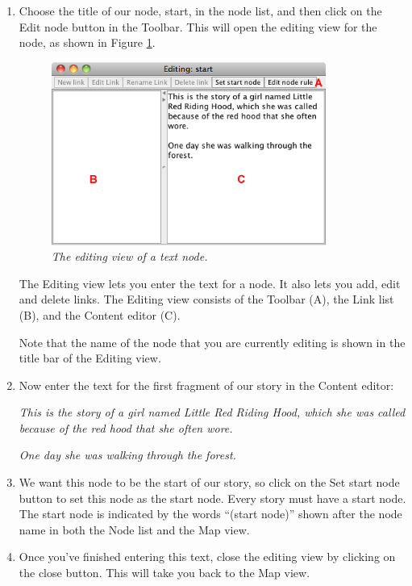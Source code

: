 \documentclass{article}
\begin{document}
\begin{enumerate}
  \item Choose the title of our node, start, in the node list, and then click
  on the Edit node button in the Toolbar. This will open the editing view for
  the node, as shown in Figure \ref{fig:tut1:edit_node}. 
  
\begin{figure}[ht]
  \centering
  \includegraphics[width=9cm]{images/hypedyn-tutorial-1-figure-5}
  \caption{\textit{The editing view of a text node.}}
  \label{fig:tut1:edit_node}
\end{figure} 

The Editing view lets you enter the text for a node. It also lets you add, edit
and delete links. The Editing view consists of the Toolbar (A), the Link list (B),
and the Content editor (C).

Note that the name of the node that you are currently editing is shown in the
title bar of the Editing view.

\item Now enter the text for the first fragment of our story in the Content
editor:

\textit{This is the story of a girl named Little Red Riding Hood, which she was
called because of the red hood that she often wore.}

\textit{One day she was walking through the forest.}

\item We want this node to be the start of our story, so click on the Set start
node button to set this node as the start node. Every story must have a start
node. The start node is indicated by the words ``(start node)'' shown after the
node name in both the Node list and the Map view.
\item Once you've finished entering this text, close the editing view by
clicking on the close button. This will take you back to the Map view.
\end{enumerate}
\end{document}
